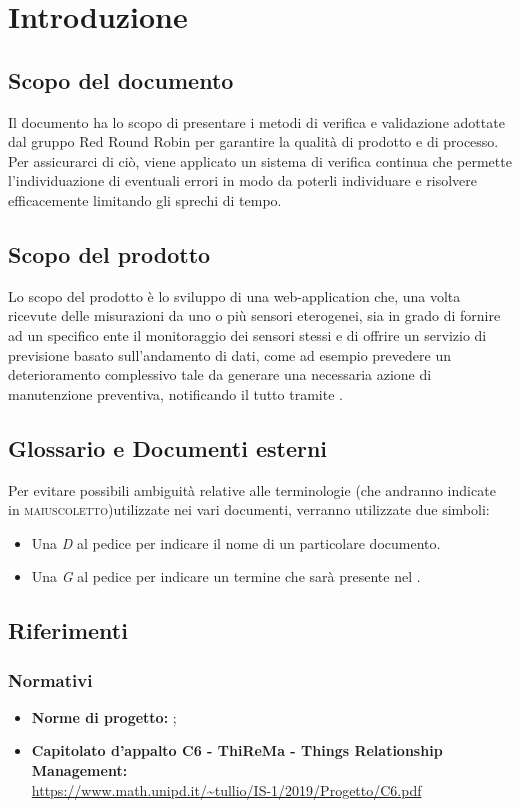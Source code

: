 \section{Introduzione}
	\subsection{Scopo del documento}
		Il documento ha lo scopo di presentare i metodi di verifica e validazione adottate dal gruppo Red Round Robin per garantire la qualità di prodotto e di processo. Per assicurarci di ciò, viene applicato un sistema di verifica continua che permette l'individuazione di eventuali errori in modo da poterli individuare e risolvere efficacemente limitando gli sprechi di tempo.
	\subsection{Scopo del prodotto}
		Lo scopo del prodotto è lo sviluppo di una web-application che, una volta ricevute delle misurazioni da uno o più sensori eterogenei, sia in grado di fornire ad un specifico ente il monitoraggio dei sensori stessi e di offrire un servizio di previsione basato sull'andamento di dati, come ad esempio prevedere un deterioramento complessivo tale da generare una necessaria azione di manutenzione preventiva, notificando il tutto tramite .

	\subsection{Glossario e Documenti esterni}
		Per evitare possibili ambiguità relative alle terminologie (che andranno indicate in \textsc{maiuscoletto})utilizzate nei vari documenti, verranno utilizzate due simboli:
		\begin{itemize}
			\item Una \textit{D} al pedice per indicare il nome di un particolare documento.
			\item Una \textit{G} al pedice per indicare un termine che sarà 
			presente nel .
		\end{itemize}

	\subsection{Riferimenti}
		\subsubsection{Normativi}
		\begin{itemize}
			\item \textbf{Norme di progetto:} ;
			\item \textbf{Capitolato d’appalto C6 - ThiReMa - Things Relationship Management:}\\
			\url{https://www.math.unipd.it/~tullio/IS-1/2019/Progetto/C6.pdf}
		\end{itemize}
